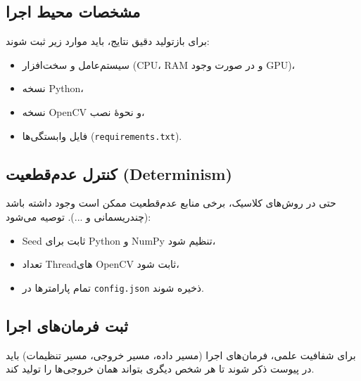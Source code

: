 
\subsection{مشخصات محیط اجرا}
برای بازتولید دقیق نتایج، باید موارد زیر ثبت شوند:
\begin{itemize}
  \item سیستم‌عامل و سخت‌افزار (CPU، RAM و در صورت وجود GPU)،
  \item نسخه Python،
  \item نسخه OpenCV و نحوهٔ نصب،
  \item فایل وابستگی‌ها (\texttt{requirements.txt}).
\end{itemize}

\subsection{کنترل عدم‌قطعیت (Determinism)}
حتی در روش‌های کلاسیک، برخی منابع عدم‌قطعیت ممکن است وجود داشته باشد (چندریسمانی و ...). توصیه می‌شود:
\begin{itemize}
  \item Seed ثابت برای Python و NumPy تنظیم شود،
  \item تعداد Threadهای OpenCV ثابت شود،
  \item تمام پارامترها در \texttt{config.json} ذخیره شوند.
\end{itemize}

\subsection{ثبت فرمان‌های اجرا}
برای شفافیت علمی، فرمان‌های اجرا (مسیر داده، مسیر خروجی، مسیر تنظیمات) باید در پیوست ذکر شوند تا هر شخص دیگری بتواند همان خروجی‌ها را تولید کند.
